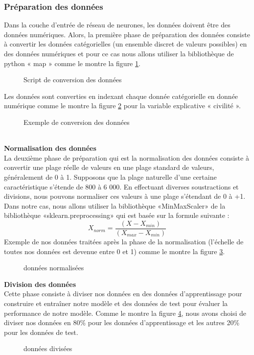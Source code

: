 \subsubsection{Préparation des données}
Dans la couche d'entrée de réseau de neurones, les données doivent être des données numériques. Alors, la première phase de préparation des données consiste à convertir les données catégorielles (un ensemble discret de valeurs possibles) en des données numériques et pour ce cas nous allons utiliser la bibliothèque de python « map » comme le montre la figure     \ref{fig:mapPython}.
  \begin{figure}[htpb]
    \centering
    \caption{Script de conversion des données}
    \label{fig:mapPython}
    \end{figure}
    \newpage
Les données sont converties en indexant chaque donnée catégorielle en donnée numérique comme le montre la figure \ref{fig:civilite} pour la variable explicative « civilité ».
  \begin{figure}[htpb]
    \centering
    \caption{Exemple de conversion des données}
    \label{fig:civilite}
    \end{figure}
    \\
\textbf{Normalisation des données}\\
La deuxième phase de préparation qui est la normalisation des données consiste à convertir une plage réelle de valeurs en une plage standard de valeurs, généralement de 0 à 1. Supposons que la plage naturelle d'une certaine caractéristique s'étende de 800 à 6 000. En effectuant diverses soustractions et divisions, nous pouvons normaliser ces valeurs à une plage s'étendant de 0 à +1.\\
Dans notre cas, nous allons utiliser la bibliothèque «MinMaxScaler» de la bibliothèque «sklearn.preprocessing» qui est basée sur la formule suivante :
\[X_{norm}=\frac{(X - X_{min})}{(X_{max} - X_{min})}\]
Exemple de nos données traitées après la phase de la normalisation (l’échelle de toutes nos données est devenue entre 0 et 1) comme le montre la figure \ref{fig:normalisedata}.
   \begin{figure}[htpb]
    \centering
    \caption{données normalisées}
    \label{fig:normalisedata}
    \end{figure}
\newpage
\textbf{Division des données}\\
Cette phase consiste à diviser nos données en des données d'apprentissage pour construire et entraîner notre modèle et des données de test pour évaluer la performance de notre modèle.
Comme le montre la figure \ref{fig:splitdata}, nous avons choisi de diviser nos données en 80\% pour les données d'apprentissage et les autres 20\% pour les données de test.
   \begin{figure}[htpb]
    \centering
    \caption{données divisées}
    \label{fig:splitdata}
    \end{figure}

